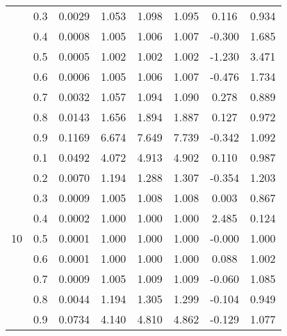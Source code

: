 \documentclass[11pt,a4paper]{report}
\begin{document}
\begin{longtable}{ | c | c || c | c | c | c | c | c | }
 & 0.3 & 0.0029 & 1.053 & 1.098 & 1.095 & 0.116 & 0.934 \\
 & 0.4 & 0.0008 & 1.005 & 1.006 & 1.007 & -0.300 & 1.685 \\
 & 0.5 & 0.0005 & 1.002 & 1.002 & 1.002 & -1.230 & 3.471 \\
 & 0.6 & 0.0006 & 1.005 & 1.006 & 1.007 & -0.476 & 1.734 \\
 & 0.7 & 0.0032 & 1.057 & 1.094 & 1.090 & 0.278 & 0.889 \\
 & 0.8 & 0.0143 & 1.656 & 1.894 & 1.887 & 0.127 & 0.972 \\
 & 0.9 & 0.1169 & 6.674 & 7.649 & 7.739 & -0.342 & 1.092 \\
 \hline
\multirow{9}{*}{10} & 0.1 & 0.0492 & 4.072 & 4.913 & 4.902 & 0.110 & 0.987 \\
 & 0.2 & 0.0070 & 1.194 & 1.288 & 1.307 & -0.354 & 1.203 \\
 & 0.3 & 0.0009 & 1.005 & 1.008 & 1.008 & 0.003 & 0.867 \\
 & 0.4 & 0.0002 & 1.000 & 1.000 & 1.000 & 2.485 & 0.124 \\
 & 0.5 & 0.0001 & 1.000 & 1.000 & 1.000 & -0.000 & 1.000 \\
 & 0.6 & 0.0001 & 1.000 & 1.000 & 1.000 & 0.088 & 1.002 \\
 & 0.7 & 0.0009 & 1.005 & 1.009 & 1.009 & -0.060 & 1.085 \\
 & 0.8 & 0.0044 & 1.194 & 1.305 & 1.299 & -0.104 & 0.949 \\
 & 0.9 & 0.0734 & 4.140 & 4.810 & 4.862 & -0.129 & 1.077 \\
 \hline
\hline
\end{longtable}
\end{document}
